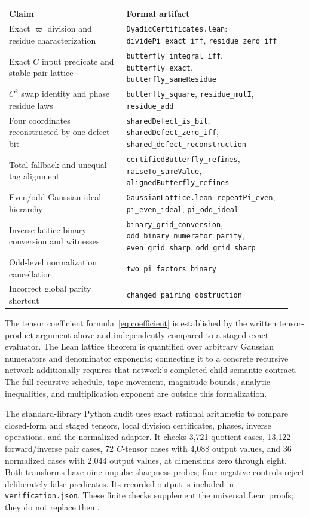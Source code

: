 \documentclass[11pt]{article}
\theoremstyle{definition}\newtheorem{definition}[theorem]{Definition}
\theoremstyle{remark}\newtheorem{remark}[theorem]{Remark}
\newcommand{\p}{\varpi}
\newcommand{\code}[1]{\nolinkurl{#1}}
\begin{document}
\begin{center}
\small
\begin{tabular}{@{}>{\raggedright\arraybackslash}p{0.39\linewidth}>{\raggedright\arraybackslash}p{0.55\linewidth}@{}}
\toprule
Claim & Formal artifact\\
\midrule
Exact $\p$ division and residue characterization & \code{DyadicCertificates.lean}: \code{dividePi_exact_iff}, \code{residue_zero_iff}\\
Exact $C$ input predicate and stable pair lattice & \code{butterfly_integral_iff}, \code{butterfly_exact}, \code{butterfly_sameResidue}\\
$C^2$ swap identity and phase residue laws & \code{butterfly_square}, \code{residue_mulI}, \code{residue_add}\\
Four coordinates reconstructed by one defect bit & \code{sharedDefect_is_bit}, \code{sharedDefect_zero_iff}, \code{shared_defect_reconstruction}\\
Total fallback and unequal-tag alignment & \code{certifiedButterfly_refines}, \code{raiseTo_sameValue}, \code{alignedButterfly_refines}\\
Even/odd Gaussian ideal hierarchy & \code{GaussianLattice.lean}: \code{repeatPi_even}, \code{pi_even_ideal}, \code{pi_odd_ideal}\\
Inverse-lattice binary conversion and witnesses & \code{binary_grid_conversion}, \code{odd_binary_numerator_parity}, \code{even_grid_sharp}, \code{odd_grid_sharp}\\
Odd-level normalization cancellation & \code{two_pi_factors_binary}\\
Incorrect global parity shortcut & \code{changed_pairing_obstruction}\\
\bottomrule
\end{tabular}
\end{center}
The tensor coefficient formula~\eqref{eq:coefficient} is established by the written tensor-product argument above and independently compared to a staged exact evaluator. The Lean lattice theorem is quantified over arbitrary Gaussian numerators and denominator exponents; connecting it to a concrete recursive network additionally requires that network's completed-child semantic contract. The full recursive schedule, tape movement, magnitude bounds, analytic inequalities, and multiplication exponent are outside this formalization.

The standard-library Python audit uses exact rational arithmetic to compare closed-form and staged tensors, local division certificates, phases, inverse operations, and the normalized adapter. It checks 3,721 quotient cases, 13,122 forward/inverse pair cases, 72 $C$-tensor cases with 4,088 output values, and 36 normalized cases with 2,044 output values, at dimensions zero through eight. Both transforms have nine impulse sharpness probes; four negative controls reject deliberately false predicates. Its recorded output is included in \code{verification.json}. These finite checks supplement the universal Lean proofs; they do not replace them.
\end{document}
